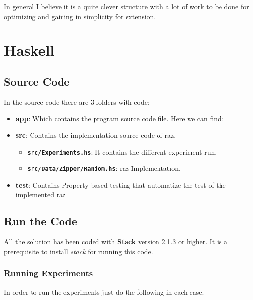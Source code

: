\documentclass[12pt, a4paper]{article}
\begin{document}
In general I believe it is a quite clever structure with a lot of work to be done for optimizing and gaining in simplicity for extension.




\printglossary[type=\acronymtype]

\appendix\label{apx:org}
\section{Haskell}
\subsection{Source Code}
In the source code there are 3 folders with code:

\begin{itemize}
  \item \textbf{app}: Which contains the program source code file. Here we can find:
  \item \textbf{src}: Contains the implementation source code of \acrshort{raz}.
    \begin{itemize}
      \item \textbf{\texttt{src/Experiments.hs}}: It contains the different experiment run.
      \item \textbf{\texttt{src/Data/Zipper/Random.hs}}: \acrshort{raz} Implementation.
    \end{itemize}
  \item \textbf{test}: Contains Property based testing that automatize the test of the implemented \acrshort{raz}
\end{itemize}

\subsection{Run the Code}
All the solution has been coded with \textbf{Stack} \cite{stack} version 2.1.3 or higher. It is a prerequisite to install \textit{stack} for running this code.

\subsubsection{Running Experiments}
In order to run the experiments just do the following in each case.
\end{document}
